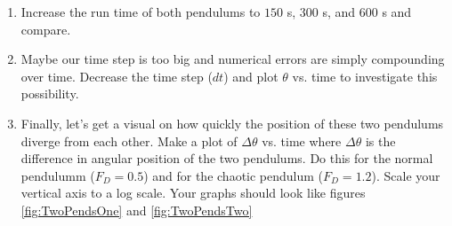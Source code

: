 \begin{enumerate}
\begin{enumerate}
\item Increase the run time of both pendulums to $150$ s, $300$ s, and
  $600$ s and compare.
\item Maybe our time step is too big and numerical errors are simply
  compounding over time.  Decrease the time step ($dt$) and plot
  $\theta$ vs. time to investigate this possibility.
\item Finally, let's get a visual on how quickly the position of these
  two pendulums diverge from each other.  Make a plot of $\Delta
  \theta$ vs. time where $\Delta \theta$ is the difference in angular
  position of the two pendulums.  Do this for the normal pendulumm
  ($F_D = 0.5$) and for the chaotic pendulum ($F_D= 1.2$). Scale your
  vertical axis to a log scale.  Your
  graphs should look like figures  \ref{fig:TwoPendsOne} and \ref{fig:TwoPendsTwo}
\end{enumerate}
\end{enumerate}


